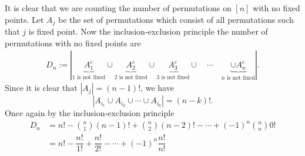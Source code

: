 \begin{solution}
It is clear that we are counting the number of permutations on $[n]$ with no fixed points. Let $A_j$ be the set of permutations which consist of all permutations such that $j$ is fixed point. Now the inclusion-exclusion principle the number of permutations with no fixed points are
\begin{align*}
D_n:=|\underbrace{A_1^c}_{1 \text{ is not fixed}} \cup \underbrace{A_2^c}_{2 \text{ is not fixed}} \cup \underbrace{A_3^c}_{3 \text{ is not fixed}} \cup \quad \cdots \quad \underbrace{\cup A_n^c}_{n \text{ is not fixed}}|.
\end{align*}
Since it is clear that $|A_j|=(n-1)!$, we have
\[
|A_{i_1}\cup A_{i_2}\cup \cdots \cup A_{i_k}| = (n-k)!.
\]
Once again by the inclusion-exclusion principle
\begin{align*}
    D_n &= n! - \binom{n}{1}(n-1)! + \binom{n}{2}(n-2)! -  \cdots + (-1)^n\binom{n}{n}0! \\
    &= n! - \dfrac{n!}{1!} + \dfrac{n!}{2!} - \cdots + (-1)^n\dfrac{n!}{n!}
\end{align*}
\end{solution}

